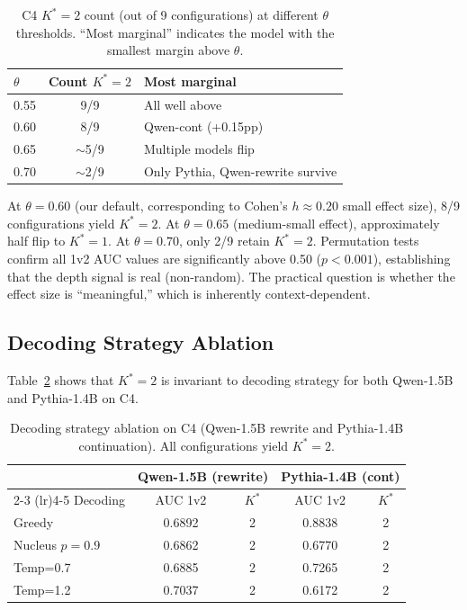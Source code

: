 \documentclass[11pt]{article}
\newcommand{\kstar}{K^*}
\newcommand{\thetaval}{\theta}
\begin{document}
\begin{table}[t]
\centering
\caption{C4 $\kstar{=}2$ count (out of 9 configurations) at different $\thetaval$ thresholds. ``Most marginal'' indicates the model with the smallest margin above $\thetaval$.}
\label{tab:theta}
\small
\begin{tabular}{lcl}
\toprule
$\thetaval$ & Count $\kstar{=}2$ & Most marginal \\
\midrule
0.55 & 9/9 & All well above \\
0.60 & 8/9 & Qwen-cont (+0.15pp) \\
0.65 & $\sim$5/9 & Multiple models flip \\
0.70 & $\sim$2/9 & Only Pythia, Qwen-rewrite survive \\
\bottomrule
\end{tabular}
\end{table}

At $\thetaval = 0.60$ (our default, corresponding to Cohen's $h \approx 0.20$ small effect size), 8/9 configurations yield $\kstar{=}2$.
At $\thetaval = 0.65$ (medium-small effect), approximately half flip to $\kstar{=}1$.
At $\thetaval = 0.70$, only 2/9 retain $\kstar{=}2$.
Permutation tests confirm all 1v2 AUC values are significantly above 0.50 ($p < 0.001$), establishing that the depth signal is real (non-random). The practical question is whether the effect size is ``meaningful,'' which is inherently context-dependent.


\subsection{Decoding Strategy Ablation}
\label{sec:decoding}

Table~\ref{tab:decoding} shows that $\kstar{=}2$ is invariant to decoding strategy for both Qwen-1.5B and Pythia-1.4B on C4.

\begin{table}[t]
\centering
\caption{Decoding strategy ablation on C4 (Qwen-1.5B rewrite and Pythia-1.4B continuation). All configurations yield $\kstar{=}2$.}
\label{tab:decoding}
\small
\begin{tabular}{lcccc}
\toprule
& \multicolumn{2}{c}{Qwen-1.5B (rewrite)} & \multicolumn{2}{c}{Pythia-1.4B (cont)} \\
\cmidrule(lr){2-3} \cmidrule(lr){4-5}
Decoding & AUC 1v2 & $\kstar$ & AUC 1v2 & $\kstar$ \\
\midrule
Greedy & 0.6892 & 2 & 0.8838 & 2 \\
Nucleus $p{=}0.9$ & 0.6862 & 2 & 0.6770 & 2 \\
Temp=0.7 & 0.6885 & 2 & 0.7265 & 2 \\
Temp=1.2 & 0.7037 & 2 & 0.6172 & 2 \\
\bottomrule
\end{tabular}
\end{table}
\end{document}
